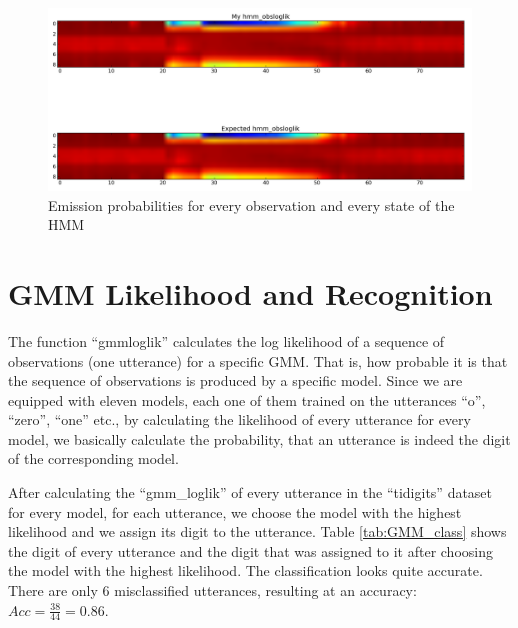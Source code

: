 \documentclass[12pt,a4paper,oneside]{article}
\begin{document}
\begin{figure}
\includegraphics[scale=0.4]{../hmm_obsloglik.png}
\caption{Emission probabilities for every observation and every state of the HMM}
\label{fig:hmm_obsloglik}
\end{figure}

\section{GMM Likelihood and Recognition}
The function ``gmmloglik'' calculates the log likelihood of a sequence of observations (one utterance) for a specific GMM. That is, how probable it is that the sequence of observations is produced by a specific model. Since we are equipped with eleven models, each one of them trained on the utterances ``o'', ``zero'', ``one'' etc., by calculating the likelihood of every utterance for every model, we basically calculate the probability, that an utterance is indeed the digit of the corresponding model.

After calculating the ``gmm\_loglik'' of every utterance in the ``tidigits'' dataset for every model, for each utterance, we choose the model with the highest likelihood and we assign its digit to the utterance. Table \ref{tab:GMM_class} shows the digit of every utterance and the digit that was assigned to it after choosing the model with the highest likelihood. The classification looks quite accurate. There are only 6 misclassified utterances, resulting at an accuracy: $Acc = \frac{38}{44} = 0.86$.
\end{document}
